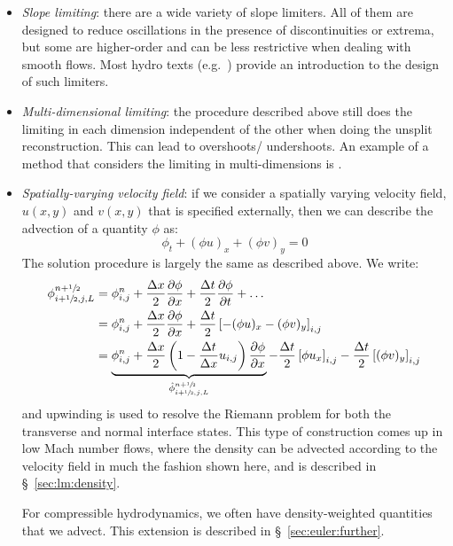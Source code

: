 \begin{itemize}

\item {\em Slope limiting}: there are a wide variety of slope
  limiters.  All of them are designed to reduce oscillations in the
  presence of discontinuities or extrema, but some are higher-order
  and can be less restrictive when dealing with smooth flows.  Most
  hydro texts (e.g.\ \cite{leveque:2002,toro:1997}) provide an
  introduction to the design of such limiters.

\item {\em Multi-dimensional limiting}: the procedure described above
  still does the limiting in each dimension independent of the other
  when doing the unsplit reconstruction.  This can lead to overshoots/
  undershoots.  An example of a method that considers the limiting
  in multi-dimensions is \cite{BDS,quadBDS}.

\item {\em Spatially-varying velocity field}: if we consider a spatially
  varying velocity field, $u(x,y)$ and $v(x,y)$ that is specified externally,
  then we can describe the advection of a quantity $\phi$ as:
  \begin{equation}
  \phi_t + (\phi u)_x + (\phi v)_y = 0
  \end{equation}
  The solution procedure is largely the same as described above.  We write:
\begin{align}
\phi_{i+\myhalf,j,L}^{n+\myhalf} &= \phi_{i,j}^n + 
   \frac{\Delta x}{2} \frac{\partial \phi}{\partial x} +
   \frac{\Delta t}{2} \frac{\partial \phi}{\partial t} + \ldots \nonumber \\
%
 &= \phi_{i,j}^n + 
    \frac{\Delta x}{2} \frac{\partial \phi}{\partial x} +
    \frac{\Delta t}{2} \left [ -(\phi u)_x -(\phi v)_y \right ]_{i,j} \nonumber\\
%
 &= \underbrace{\phi_{i,j}^n + 
   \frac{\Delta x}{2} \left ( 1 - \frac{\Delta t}{\Delta x} u_{i,j} \right )
        \frac{\partial \phi}{\partial x}}_{\hat{\phi}_{i+\myhalf,j,L}^{n+\myhalf}}
   - \frac{\Delta t}{2} \left [\phi u_x \right ]_{i,j} 
   - \frac{\Delta t}{2} \left [ (\phi v)_y \right ]_{i,j}
\end{align}
  and upwinding is used to resolve the Riemann problem for both the
  transverse and normal interface states.  This type of construction
  comes up in low Mach number flows, where the density can be advected
  according to the velocity field in much the fashion shown here, and
  is described in \S~\ref{sec:lm:density}.

  
  For compressible hydrodynamics, we often have density-weighted quantities
  that we advect.  This extension is described in \S~\ref{sec:euler:further}.

\end{itemize}


